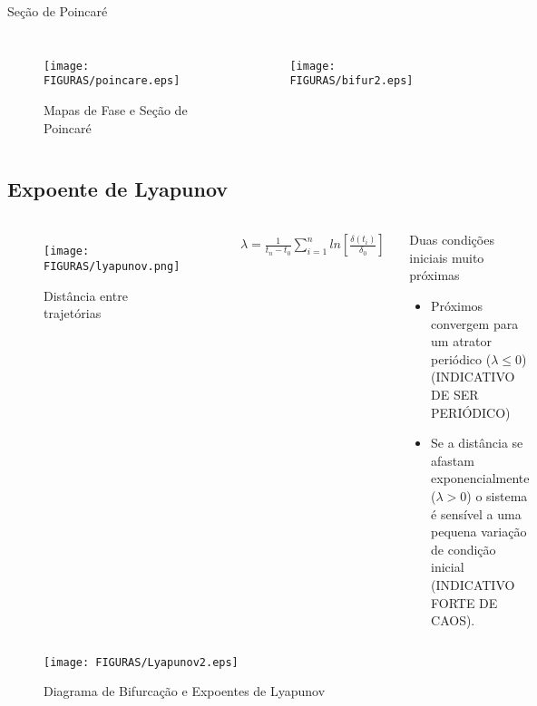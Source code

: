 \documentclass[12pt,aspectratio=169]{beamer}
\begin{document}
\begin{frame}{Seção de Poincaré}
\begin{columns}
        \begin{figure}[h]
            \centering
            \texttt{[image: FIGURAS/poincare.eps]} 
            \caption{Mapas de Fase e Seção de Poincaré}
        \end{figure}
        \begin{figure}[h]
            \centering
            \texttt{[image: FIGURAS/bifur2.eps]} 
        \end{figure}
\end{columns}
\end{frame}

\subsection{Expoente de Lyapunov}
\begin{frame}
\begin{columns}
\begin{figure}[h]
\centering
\texttt{[image: FIGURAS/lyapunov.png]} 
\caption{Distância entre trajetórias}
\label{fig:03}
\end{figure}
\begin{eqnarray}
\lambda = \frac{1}{t_n-t_0}\sum^{n}_{i=1}ln\left[ \frac{\delta(t_i)}{\delta_0} \right]
\end{eqnarray}
\begin{block}{Duas condições iniciais muito próximas}
\begin{itemize}
    \item Próximos convergem para um atrator periódico ($\lambda \leq 0$) (INDICATIVO DE SER PERIÓDICO)
    \item Se a distância se afastam exponencialmente ($\lambda > 0$) o sistema é sensível a uma pequena variação de condição inicial (INDICATIVO FORTE DE CAOS).
\end{itemize}
\end{block}
\end{columns}
\end{frame}


\begin{frame}
\begin{figure}[h]
\centering
\texttt{[image: FIGURAS/Lyapunov2.eps]} 
\caption{Diagrama de Bifurcação e Expoentes de Lyapunov}
\label{fig:03}
\end{figure}
\end{frame}
\end{document}
